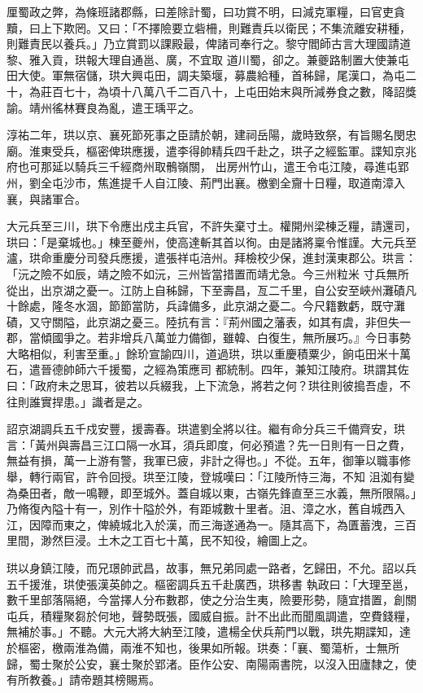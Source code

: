 \begin{pinyinscope}
 厘蜀政之弊，為條班諸郡縣，曰差除計蜀，曰功賞不明，曰減克軍糧，曰官吏貪黷，曰上下欺罔。又曰：「不擇險要立砦柵，則難責兵以衛民；不集流離安耕種，則難責民以養兵。」乃立賞罰以課殿最，俾諸司奉行之。黎守閻師古言大理國請道黎、雅入貢，珙報大理自通邕、廣，不宜取
 道川蜀，卻之。兼夔路制置大使兼屯田大使。軍無宿儲，珙大興屯田，調夫築堰，募農給種，首秭歸，尾漢口，為屯二十，為莊百七十，為頃十八萬八千二百八十，上屯田始末與所減券食之數，降詔獎諭。靖州徭林賽良為亂，遣王瑀平之。



 淳祐二年，珙以京、襄死節死事之臣請於朝，建祠岳陽，歲時致祭，有旨賜名閔忠廟。淮東受兵，樞密俾珙應援，遣李得帥精兵四千赴之，珙子之經監軍。諜知京兆府也可那延以騎兵三千經商州取鶻嶺關，
 出房州竹山，遣王令屯江陵，尋進屯郢州，劉全屯沙市，焦進提千人自江陵、荊門出襄。檄劉全齎十日糧，取道南漳入襄，與諸軍合。



 大元兵至三川，珙下令應出戍主兵官，不許失棄寸土。權開州梁棟乏糧，請還司，珙曰：「是棄城也。」棟至夔州，使高達斬其首以徇。由是諸將稟令惟謹。大元兵至瀘，珙命重慶分司發兵應援，遣張祥屯涪州。拜檢校少保，進封漢東郡公。珙言：「沅之險不如辰，靖之險不如沅，三州皆當措置而靖尤急。今三州粒米
 寸兵無所從出，出京湖之憂一。江防上自秭歸，下至壽昌，亙二千里，自公安至峽州灘磧凡十餘處，隆冬水涸，節節當防，兵諱備多，此京湖之憂二。今尺籍數虧，既守灘磧，又守關隘，此京湖之憂三。陸抗有言：『荊州國之藩表，如其有虞，非但失一郡，當傾國爭之。若非增兵八萬並力備御，雖韓、白復生，無所展巧。』今日事勢大略相似，利害至重。」餘玠宣諭四川，道過珙，珙以重慶積粟少，餉屯田米十萬石，遣晉德帥師六千援蜀，之經為策應司
 都統制。四年，兼知江陵府。珙謂其佐曰：「政府未之思耳，彼若以兵綴我，上下流急，將若之何？珙往則彼搗吾虛，不往則誰實捍患。」識者是之。



 詔京湖調兵五千戍安豐，援壽春。珙遣劉全將以往。繼有命分兵三千備齊安，珙言：「黃州與壽昌三江口隔一水耳，須兵即度，何必預遣？先一日則有一日之費，無益有損，萬一上游有警，我軍已疲，非計之得也。」不從。五年，御筆以職事修舉，轉行兩官，許令回授。珙至江陵，登城嘆曰：「江陵所恃三海，不知
 沮洳有變為桑田者，敵一鳴鞭，即至城外。蓋自城以東，古嶺先鋒直至三水義，無所限隔。」乃脩復內隘十有一，別作十隘於外，有距城數十里者。沮、漳之水，舊自城西入江，因障而東之，俾繞城北入於漢，而三海遂通為一。隨其高下，為匱蓄洩，三百里間，渺然巨浸。土木之工百七十萬，民不知役，繪圖上之。



 珙以身鎮江陵，而兄璟帥武昌，故事，無兄弟同處一路者，乞歸田，不允。詔以兵五千援淮，珙使張漢英帥之。樞密調兵五千赴廣西，珙移書
 執政曰：「大理至邕，數千里部落隔絕，今當擇人分布數郡，使之分治生夷，險要形勢，隨宜措置，創關屯兵，積糧聚芻於何地，聲勢既張，國威自振。計不出此而聞風調遣，空費錢糧，無補於事。」不聽。大元大將大納至江陵，遣楊全伏兵荊門以戰，珙先期諜知，達於樞密，檄兩淮為備，兩淮不知也，後果如所報。珙奏：「襄、蜀蕩析，士無所歸，蜀士聚於公安，襄士聚於郢渚。臣作公安、南陽兩書院，以沒入田廬隸之，使有所教養。」請帝題其榜賜焉。




\end{pinyinscope}
